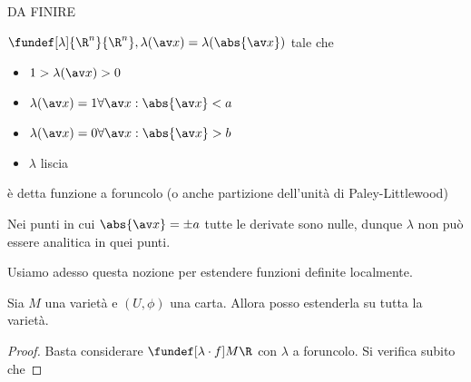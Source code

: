 
DA FINIRE

\begin{defn}
 $\fundef[\lambda] {\R^n}{\R^n}, \lambda(\av x) = \lambda(\abs{\av x})$ tale che 
 \begin{itemize}
  \item $1 > \lambda(\av x) > 0$
  \item $\lambda(\av x) = 1 \forall \av x: \abs{\av x} < a$
  \item $\lambda(\av x) = 0 \forall \av x: \abs{\av x} > b$
  \item $\lambda$ liscia
 \end{itemize}
 è detta funzione a foruncolo (o anche partizione dell'unità di Paley-Littlewood)
\end{defn}
\begin{oss}
 Nei punti in cui $\abs{\av x} = \pm a$ tutte le derivate sono nulle, dunque $\lambda$ non può essere analitica in quei punti.
\end{oss}
Usiamo adesso questa nozione per estendere funzioni definite localmente.
\begin{prop}
 Sia $M$ una varietà e $(U, \phi)$ una carta. Allora posso estenderla su tutta la varietà.
\end{prop}
 \begin{proof}
  Basta considerare $\fundef[\lambda\cdot f] M\R$ con $\lambda$ a foruncolo. Si verifica subito che 
 \end{proof}
 
